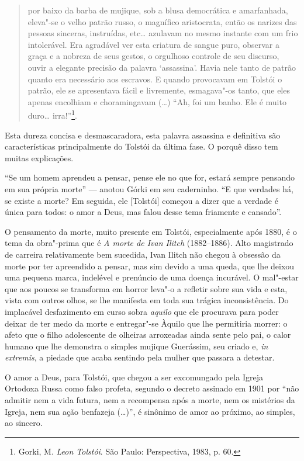 \begin{quote}
por baixo da barba de
mujique, sob a blusa democrática e amarfanhada, eleva"-se o velho patrão
russo, o magnífico aristocrata, então os narizes das pessoas sinceras,
instruídas, etc\ldots{} azulavam no mesmo instante com um frio intolerável.
Era agradável ver esta criatura de sangue puro, observar a graça e a
nobreza de seus gestos, o orgulhoso controle de seu discurso, ouvir a
elegante precisão da palavra `assassina'. Havia nele tanto de patrão
quanto era necessário aos escravos. E quando provocavam em Tolstói o
patrão, ele se apresentava fácil e livremente, esmagava"-os tanto, que
eles apenas encolhiam e choramingavam (\ldots{}) ``Ah, foi um banho. Ele é
muito duro\ldots{} irra!''\footnote{Gorki, M. \emph{Leon Tolstói}. São Paulo: Perspectiva, 1983, p. 60.}.
\end{quote}

Esta dureza concisa e desmascaradora, esta palavra
assassina e definitiva são características principalmente do Tolstói
da última fase. O porquê disso tem muitas explicações.

``Se um homem aprendeu a pensar, pense ele no que
for, estará sempre pensando em sua própria morte'' --- anotou Górki em
seu caderninho. ``E que verdades há, se existe a morte? Em seguida,
ele [Tolstói] começou a dizer que a verdade é única para todos: o
amor a Deus, mas falou desse tema friamente e cansado''.

O pensamento da morte, muito presente em Tolstói, especialmente após
1880, é o tema da obra"-prima que é \emph{A morte de Ivan Ilitch} (1882--1886). Alto magistrado de carreira relativamente bem
sucedida, Ivan Ilitch não chegou à obsessão da morte
por ter apreendido a pensar, mas sim devido a uma queda, que lhe
deixou uma pequena marca, indelével e prenúncio de uma doença
incurável. O mal"-estar que aos poucos se transforma em horror leva"-o a
refletir sobre sua vida e esta, vista com outros olhos, se
lhe manifesta em toda sua trágica inconsistência. Do
implacável desfazimento em curso sobra \emph{aquilo} que ele procurava
para poder deixar de ter medo da morte e entregar"-se Àquilo que lhe
permitiria morrer: o afeto que o filho adolescente de olheiras
arroxeadas ainda sente pelo pai, o calor humano que lhe demonstra o
simples mujique Guerássim, seu criado e, \emph{in extremis}, a
piedade que acaba sentindo pela mulher que passara a detestar.

O amor a Deus, para Tolstói, que chegou a ser excomungado pela
Igreja Ortodoxa Russa como falso profeta, segundo o decreto assinado
em 1901 por ``não admitir nem a vida futura, nem a recompensa após a
morte, nem os mistérios da Igreja, nem sua ação benfazeja (\ldots{})'', é
sinônimo de amor ao próximo, ao simples, ao sincero.

